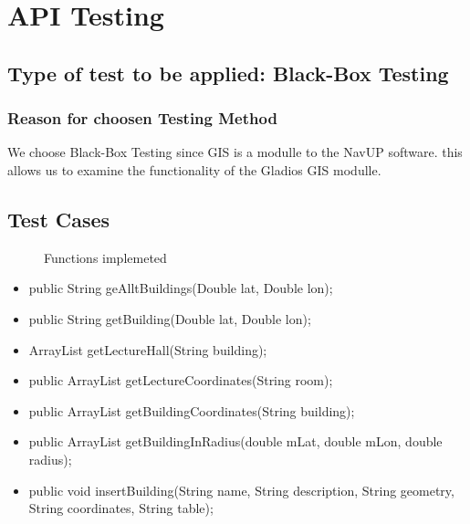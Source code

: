 \documentclass[12pt]{article}
\begin{document}
	

\section{API Testing}
	\subsection{Type of test to be applied: Black-Box Testing}
		\subsubsection{Reason for choosen Testing Method }
		We choose Black-Box Testing since GIS is a modulle to the NavUP software. this allows us to examine the functionality of 
		the Gladios GIS modulle.


	\subsection{Test Cases}
		\begin{description}
			\item[] Functions implemeted
		\end{description}
	\begin{itemize}
		
		\item{public String geAlltBuildings(Double lat, Double lon);}
		
		
		\item{public String getBuilding(Double lat, Double lon);}
		
		
		\item{ArrayList getLectureHall(String building);}
		
		
		\item{public ArrayList getLectureCoordinates(String room);}
		
		
		\item	{public ArrayList getBuildingCoordinates(String building);   }        
		
		\item{public ArrayList getBuildingInRadius(double mLat, double mLon, double radius);}    
		
		\item {public void insertBuilding(String name, String description, String geometry, String coordinates, String table);}
	\end{itemize}
		
\end{document}
